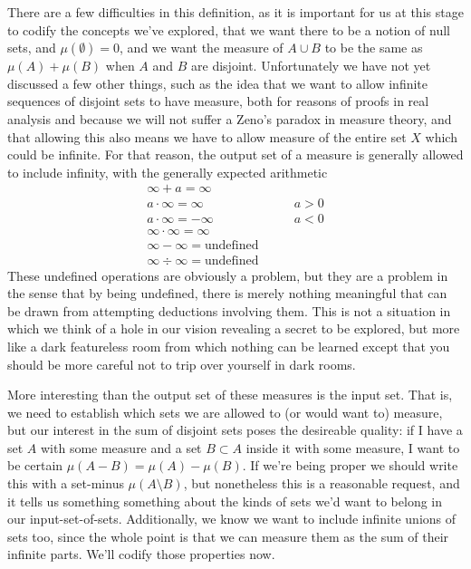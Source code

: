 \documentclass[11pt]{article}
\begin{document}
There are a few difficulties in this definition, as it is important for us at this stage to codify the concepts we've explored, that we want there to be a notion of null sets, and $\mu(\emptyset) = 0$, and we want the measure of $A \cup B$ to be the same as $\mu(A) + \mu(B)$ when $A$ and $B$ are disjoint. Unfortunately we have not yet discussed a few other things, such as the idea that we want to allow infinite sequences of disjoint sets to have measure, both for reasons of proofs in real analysis and because we will not suffer a Zeno's paradox in measure theory, and that allowing this also means we have to allow measure of the entire set $X$ which could be infinite. For that reason, the output set of a measure is generally allowed to include infinity, with the generally expected arithmetic \begin{align*}
\infty + a = \infty & \\
a \cdot \infty = \infty & \hspace{2em} a > 0 \\
a \cdot \infty = -\infty & \hspace{2em} a < 0 \\
\infty \cdot \infty = \infty \\
\infty - \infty = \text{undefined}\\
\infty \div \infty = \text{undefined}
\end{align*}
These undefined operations are obviously a problem, but they are a problem in the sense that by being undefined, there is merely nothing meaningful that can be drawn from attempting deductions involving them. This is not a situation in which we think of a hole in our vision revealing a secret to be explored, but more like a dark featureless room from which nothing can be learned except that you should be more careful not to trip over yourself in dark rooms.

More interesting than the output set of these measures is the input set. That is, we need to establish which sets we are allowed to (or would want to) measure, but our interest in the sum of disjoint sets poses the desireable quality: if I have a set $A$ with some measure and a set $B \subset A$ inside it with some measure, I want to be certain $\mu(A - B) = \mu(A) - \mu(B)$. If we're being proper we should write this with a set-minus $\mu(A \setminus B)$, but nonetheless this is a reasonable request, and it tells us something something about the kinds of sets we'd want to belong in our input-set-of-sets. Additionally, we know we want to include infinite unions of sets too, since the whole point is that we can measure them as the sum of their infinite parts. We'll codify those properties now.
\end{document}
